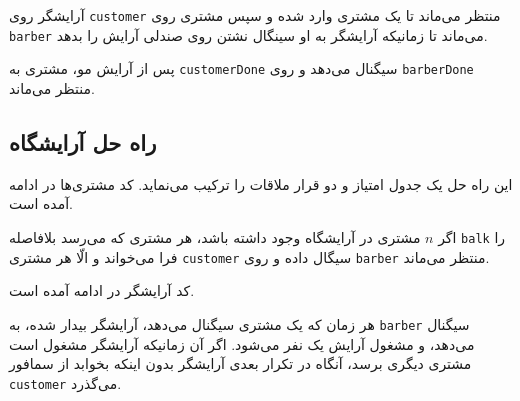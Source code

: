 \documentclass{book}
\newcommand{\clearemptydoublepage}{\newpage\cleardoublepage}
\begin{document}
    آرایشگر روی {\tt customer} منتظر می‌ماند تا یک مشتری وارد شده و سپس مشتری روی  {\tt barber} می‌ماند تا زمانیکه آرایشگر 
    به او سینگال نشتن روی صندلی آرایش را بدهد. 

    پس از آرایش مو، مشتری به  {\tt customerDone}  سیگنال می‌دهد و روی {\tt barberDone} منتظر می‌ماند. 

\clearemptydoublepage
\subsection{راه حل آرایشگاه}

    این راه حل یک جدول امتیاز و دو قرار ملاقات را ترکیب می‌نماید. کد مشتری‌ها در ادامه آمده است. 

%


    اگر  $n$ مشتری در آرایشگاه وجود داشته باشد، هر مشتری که می‌رسد بلافاصله {\tt balk} را فرا می‌خواند و الّا هر مشتری {\tt customer}  
    سیگال داده و روی {\tt barber} منتظر می‌ماند. 

    کد آرایشگر در ادامه آمده است. 

%


    هر زمان که  یک مشتری سیگنال می‌دهد، آرایشگر بیدار شده، به  {\tt barber} سیگنال می‌دهد، و مشغول آرایش یک نفر می‌شود. 
    اگر آن زمانیکه آرایشگر مشغول است مشتری دیگری برسد، آنگاه در تکرار بعدی آرایشگر بدون اینکه بخوابد از سمافور {\tt customer} می‌گذرد. 
\end{document}
